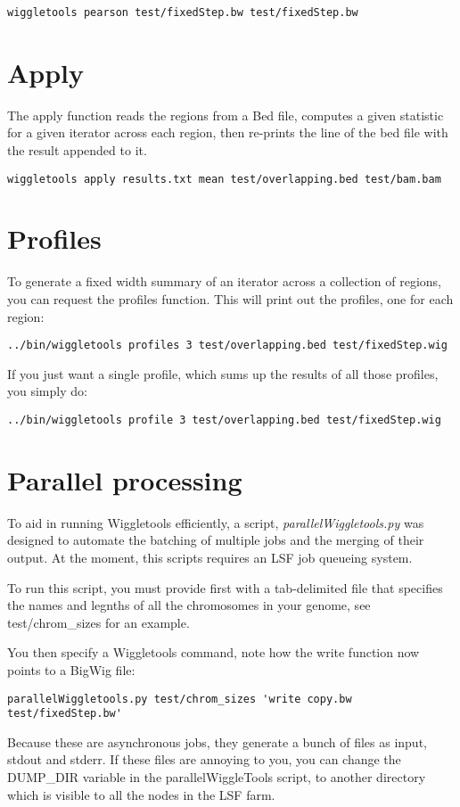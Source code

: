 \documentclass[12pt]{article}
\begin{document}
\begin{verbatim}
wiggletools pearson test/fixedStep.bw test/fixedStep.bw 
\end{verbatim}

\section{Apply}

The apply function reads the regions from a Bed file, computes a given statistic for a given iterator across each region, then re-prints the line of the bed file with the result appended to it.

\begin{verbatim}
wiggletools apply results.txt mean test/overlapping.bed test/bam.bam 
\end{verbatim}

\section{Profiles}

To generate a fixed width summary of an iterator across a collection of regions, you can request the profiles function. This will print out the profiles, one for each region:

\begin{verbatim}
../bin/wiggletools profiles 3 test/overlapping.bed test/fixedStep.wig
\end{verbatim}

If you just want a single profile, which sums up the results of all those profiles, you simply do:

\begin{verbatim}
../bin/wiggletools profile 3 test/overlapping.bed test/fixedStep.wig
\end{verbatim}

\section{Parallel processing}

To aid in running Wiggletools efficiently, a script, \emph{parallelWiggletools.py} was designed to automate the batching of multiple jobs and the merging of their output. At the moment, this scripts requires an LSF job queueing system.

To run this script, you must provide first with a tab-delimited file that specifies the names and legnths of all the chromosomes in your genome, see test/chrom\_sizes for an example.

You then specify a Wiggletools command, note how the write function now points to a BigWig file:

\begin{verbatim}
parallelWiggletools.py test/chrom_sizes 'write copy.bw test/fixedStep.bw'
\end{verbatim}

Because these are asynchronous jobs, they generate a bunch of files as input, stdout and stderr. If these files are annoying to you, you can change the DUMP\_DIR variable in the parallelWiggleTools script, to another directory which is visible to all the nodes in the LSF farm.
\end{document}
